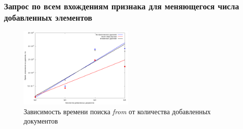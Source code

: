\documentclass[aspectratio=169, pdf, 8pt, unicode]{beamer}
\begin{document}
\begin{frame}[fragile]
\frametitle{Запрос по всем вхождениям признака для меняющегося числа
добавленных элементов}
\begin{figure}[H]
\centering
\includegraphics[width=0.5\textwidth]{fig/from.png}
\caption{Зависимость времени поиска \textit{from} от количества добавленных документов}
\end{figure}
\end{frame}
\end{document}
